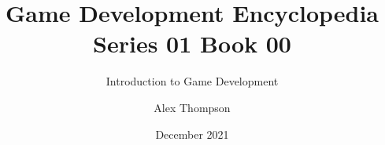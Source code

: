 \documentclass{scrbook}
\begin{document}
	
	\title{Game Development Encyclopedia Series 01 Book 00}
	\subtitle{Introduction to Game Development}
	\author{Alex Thompson}
	\date{December 2021}
	
	\frontmatter
	
	\maketitle
	\tableofcontents
	
	\mainmatter
	
	
\end{document}
